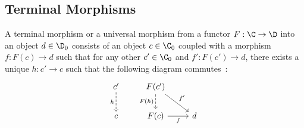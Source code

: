 \subsection*{Terminal Morphisms}

\begin{definition}
	A terminal morphism or a universal morphism from a functor $F: \C \to \D$ into
	an object $d\in \D_0$ consists of an object $c\in \C_0$ coupled with a
	morphism $f: F(c) \to d$ such that for any other $c'\in \C_0$ and $f': F(c')
	\to d$, there exists a unique $h:c' \to c$ such that the following diagram
	commutes~\parencite[p.~58]{lane:working_mathematician}:
	\[\begin{tikzcd}[ampersand replacement=\&]
		{c'} \& {F(c')} \\
		c \& {F(c)} \& d
		\arrow["{F(h)}"', dashed, from=1-2, to=2-2]
		\arrow["{f'}", from=1-2, to=2-3]
		\arrow["f"', from=2-2, to=2-3]
		\arrow["h"', dashed, from=1-1, to=2-1]
	\end{tikzcd}\]
\end{definition}

